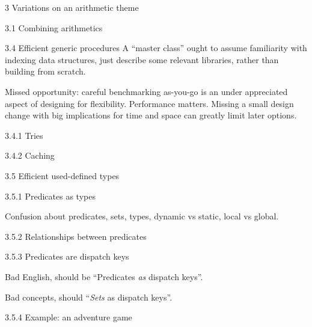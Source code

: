 \documentclass[12pt]{PalisadesLakesBook}
\begin{document}
\begin{plSection}{3 Variations on an arithmetic theme}
\begin{plSection}{3.1 Combining arithmetics}
\begin{plSection}{3.4 Efficient generic procedures}
A ``master class'' ought to assume familiarity with
indexing data structures, just describe some relevant 
libraries, rather than building from scratch.

Missed opportunity: careful benchmarking as-you-go
is an under appreciated aspect of designing for flexibility.
Performance matters. 
Missing a small design change with big
implications for time and space can greatly limit later options.

\begin{plSection}{3.4.1 Tries}
\end{plSection}%
\begin{plSection}{3.4.2 Caching}
\end{plSection}%
\end{plSection}%
\begin{plSection}{3.5 Efficient used-defined types}
\begin{plSection}{3.5.1 Predicates as types}

Confusion about predicates, sets, types,
dynamic vs static,
local vs global.

\end{plSection}%
\begin{plSection}{3.5.2 Relationships between predicates}

\end{plSection}%
\begin{plSection}{3.5.3 Predicates are dispatch keys}
 
Bad English, should be ``Predicates \emph{as} dispatch keys''.

Bad concepts, should ``\emph{Sets} as dispatch keys''.
 
\end{plSection}%
\begin{plSection}{3.5.4 Example: an adventure game}
 

\end{plSection}
\end{plSection}
\end{plSection}
\end{plSection}
\end{document}
